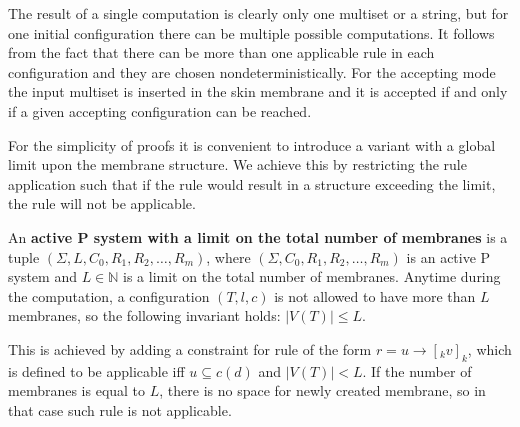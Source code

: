 The result of a single computation is clearly only one multiset or a string, but for one initial configuration there can be multiple possible computations. It follows from the fact that there can be more than one applicable rule in each configuration and they are chosen nondeterministically.
For the accepting mode the input multiset is inserted in the skin membrane and it is accepted if and only if a given accepting configuration can be reached\cite{Ibarra05Active}.


For the simplicity of proofs it is convenient to introduce a variant with a global limit upon the membrane structure. We achieve this by restricting the rule application such that if the rule would result in a structure exceeding the limit, the rule will not be applicable.

An {\bf active P system with a limit on the total number of membranes} is a tuple $(\Sigma, L, C_0, R_1, R_2, \dots , R_m)$, where $(\Sigma, C_0, R_1, R_2, \dots , R_m)$ is an active P system and $L\in \mathbb N$ is a limit on the total number of membranes. Anytime during the computation, a configuration $(T, l, c)$ is not allowed to have more than $L$ membranes, so the following invariant holds: $|V(T)|\leq L$.

This is achieved by adding a constraint for rule of the form $r = u\rightarrow [_k v]_k$, which is defined to be applicable iff $u\subseteq c(d)$ and $|V(T)|<L$. If the number of membranes is equal to $L$, there is no space for newly created membrane, so in that case such rule is not applicable.